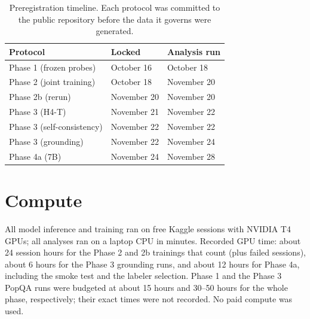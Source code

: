 \documentclass[10pt]{article}
\begin{document}
\begin{table}[h]
\centering
\small
\begin{tabular}{@{}lll@{}}
\toprule
Protocol & Locked & Analysis run \\
\midrule
Phase 1 (frozen probes) & October 16 & October 18 \\
Phase 2 (joint training) & October 18 & November 20 \\
Phase 2b (rerun) & November 20 & November 20 \\
Phase 3 (H4-T) & November 21 & November 22 \\
Phase 3 (self-consistency) & November 22 & November 22 \\
Phase 3 (grounding) & November 22 & November 24 \\
Phase 4a (7B) & November 24 & November 28 \\
\bottomrule
\end{tabular}
\caption{Preregistration timeline. Each protocol was committed to the public repository before the data it governs were generated.}
\label{tab:timeline}
\end{table}

\section{Compute}
\label{app:compute}

All model inference and training ran on free Kaggle sessions with NVIDIA T4 GPUs; all analyses ran on a laptop CPU in minutes. Recorded GPU time: about 24 session hours for the Phase 2 and 2b trainings that count (plus failed sessions), about 6 hours for the Phase 3 grounding runs, and about 12 hours for Phase 4a, including the smoke test and the labeler selection. Phase 1 and the Phase 3 PopQA runs were budgeted at about 15 hours and 30--50 hours for the whole phase, respectively; their exact times were not recorded. No paid compute was used.
\end{document}
